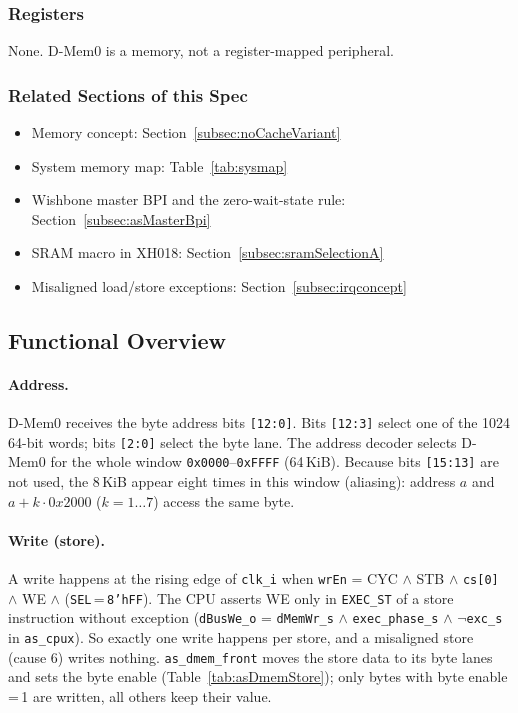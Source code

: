 \subsubsection{Registers}

None. D-Mem0 is a memory, not a register-mapped peripheral.

\subsubsection{Related Sections of this Spec}

\begin{itemize}
  \item Memory concept: Section~\ref{subsec:noCacheVariant}
  \item System memory map: Table~\ref{tab:sysmap}
  \item Wishbone master BPI and the zero-wait-state rule: Section~\ref{subsec:asMasterBpi}
  \item SRAM macro in XH018: Section~\ref{subsec:sramSelectionA}
  \item Misaligned load/store exceptions: Section~\ref{subsec:irqconcept}
\end{itemize}

\subsection{Functional Overview}
\label{subsec:dmemfunc01}

\paragraph{Address.}
D-Mem0 receives the byte address bits \texttt{[12:0]}.
Bits \texttt{[12:3]} select one of the 1024 64-bit words; bits \texttt{[2:0]}
select the byte lane. The address decoder selects D-Mem0 for the whole
window \texttt{0x0000}--\texttt{0xFFFF} (64\,KiB). Because bits \texttt{[15:13]}
are not used, the 8\,KiB appear eight times in this window (aliasing):
address $a$ and $a + k \cdot 0x2000$ ($k = 1 \ldots 7$) access the same byte.

\paragraph{Write (store).}
A write happens at the rising edge of \texttt{clk\_i} when
\texttt{wrEn} = CYC $\wedge$ STB $\wedge$ \texttt{cs[0]} $\wedge$ WE $\wedge$ (\texttt{SEL}\,=\,\texttt{8'hFF}).
The CPU asserts WE only in \texttt{EXEC\_ST} of a store instruction without
exception (\texttt{dBusWe\_o} = \texttt{dMemWr\_s} $\wedge$ \texttt{exec\_phase\_s}
$\wedge$ $\neg$\texttt{exc\_s} in \texttt{as\_cpux}). So exactly one write
happens per store, and a misaligned store (cause 6) writes nothing.
\texttt{as\_dmem\_front} moves the store data to its byte lanes and sets
the byte enable (Table~\ref{tab:asDmemStore}); only bytes with byte enable\,=\,1
are written, all others keep their value.

